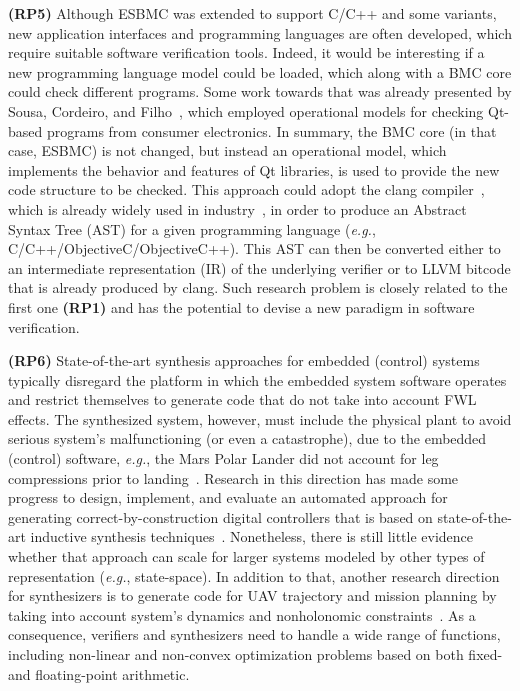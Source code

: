 \documentclass[format=acmsmall, review=false, screen=true]{acmart}
\begin{document}
{\textbf{(RP5)} Although ESBMC \cite{Cordeiro12} was extended to support C/C++ and some variants, new application interfaces and programming languages are often developed, which require suitable software verification tools. Indeed, it would be interesting if a new programming language model could be loaded, which along with a BMC core could check different programs. Some work towards that was already presented by Sousa, Cordeiro, and Filho~\cite{Garcia16}, which employed operational models for checking Qt-based programs from consumer electronics. In summary, the BMC core (in that case, ESBMC) is not changed, but instead an operational model, which implements the behavior and features of Qt libraries, is used to provide the new code structure to be checked. This approach could adopt the clang compiler~\cite{Lopes:2014:GSL:2692607}, which is already widely used in industry~\cite{clang-usage}, in order to produce an Abstract Syntax Tree (AST) for a given programming language ({\it e.g.}, C/C++/ObjectiveC/ObjectiveC++). This AST can then be converted either to an intermediate representation (IR) of the underlying verifier or to LLVM bitcode that is already produced by clang. Such research problem is closely related to the first one \textbf{(RP1)} and has the potential to devise a new paradigm in software verification.

{\textbf{(RP6)} State-of-the-art synthesis approaches for embedded (control) systems typically disregard the platform in which the embedded system software operates and restrict themselves to generate code that do not take into account FWL effects. The synthesized system, however, must include the physical plant to avoid serious system's malfunctioning (or even a catastrophe), due to the embedded (control) software, {\it e.g.}, the Mars Polar Lander did not account for leg compressions prior to landing~\cite{Jackson16}. Research in this direction has made some progress to design, implement, and evaluate an automated approach for generating correct-by-construction digital controllers that is based on state-of-the-art inductive synthesis techniques~\cite{Abate17}. Nonetheless, there is still little evidence whether that approach can scale for larger systems modeled by other types of representation ({\it e.g.}, state-space). In addition to that, another research direction for synthesizers is to generate code for UAV trajectory and mission planning by taking into account system's dynamics and nonholonomic constraints~\cite{Araujo16}. As a consequence, verifiers and synthesizers need to handle a wide range of functions, including non-linear and non-convex optimization problems based on both fixed- and floating-point arithmetic.

}}
\end{document}
